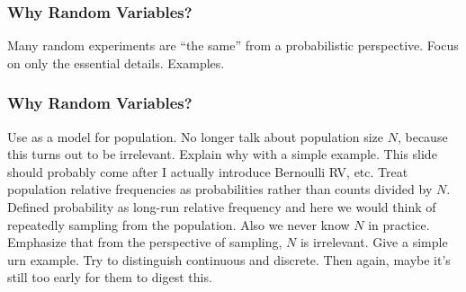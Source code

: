 \documentclass[handout]{beamer}
\begin{document}
\begin{frame}
  \frametitle{Why Random Variables?}
  Many random experiments are ``the same'' from a probabilistic perspective. Focus on only the essential details. Examples.
\end{frame}
\begin{frame}
  \frametitle{Why Random Variables?}
  Use as a model for population. No longer talk about population size $N$, because this turns out to be irrelevant. Explain why with a simple example. This slide should probably come after I actually introduce Bernoulli RV, etc. Treat population relative frequencies as probabilities rather than counts divided by $N$. Defined probability as long-run relative frequency and here we would think of repeatedly sampling from the population. Also we never know $N$ in practice. Emphasize that from the perspective of sampling, $N$ is irrelevant. Give a simple urn example. Try to distinguish continuous and discrete. Then again, maybe it's still too early for them to digest this.
\end{frame}
\end{document}
